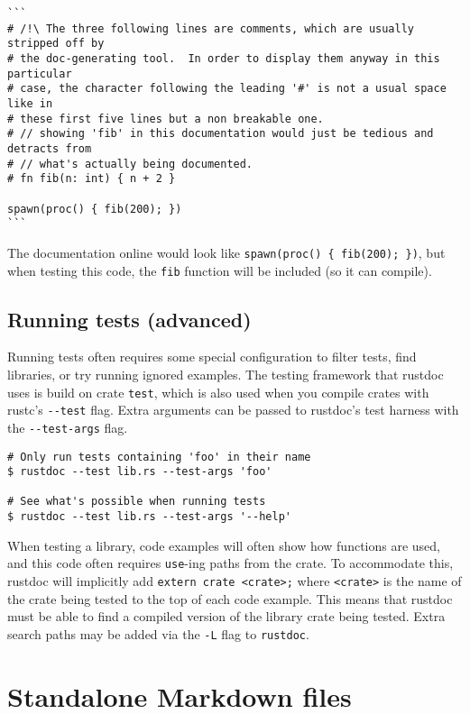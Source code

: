 \documentclass[]{article}
\begin{document}
\begin{verbatim}
```
# /!\ The three following lines are comments, which are usually stripped off by
# the doc-generating tool.  In order to display them anyway in this particular
# case, the character following the leading '#' is not a usual space like in
# these first five lines but a non breakable one.
# // showing 'fib' in this documentation would just be tedious and detracts from
# // what's actually being documented.
# fn fib(n: int) { n + 2 }

spawn(proc() { fib(200); })
```
\end{verbatim}

The documentation online would look like
\texttt{spawn(proc() \{ fib(200); \})}, but when testing this code, the
\texttt{fib} function will be included (so it can compile).

\subsection{Running tests (advanced)}\label{running-tests-advanced}

Running tests often requires some special configuration to filter tests,
find libraries, or try running ignored examples. The testing framework
that rustdoc uses is build on crate \texttt{test}, which is also used
when you compile crates with rustc's \texttt{-\/-test} flag. Extra
arguments can be passed to rustdoc's test harness with the
\texttt{-\/-test-args} flag.

\begin{verbatim}
# Only run tests containing 'foo' in their name
$ rustdoc --test lib.rs --test-args 'foo'

# See what's possible when running tests
$ rustdoc --test lib.rs --test-args '--help'
\end{verbatim}

When testing a library, code examples will often show how functions are
used, and this code often requires \texttt{use}-ing paths from the
crate. To accommodate this, rustdoc will implicitly add
\texttt{extern crate \textless{}crate\textgreater{};} where
\texttt{\textless{}crate\textgreater{}} is the name of the crate being
tested to the top of each code example. This means that rustdoc must be
able to find a compiled version of the library crate being tested. Extra
search paths may be added via the \texttt{-L} flag to \texttt{rustdoc}.

\section{Standalone Markdown files}\label{standalone-markdown-files}
\end{document}
